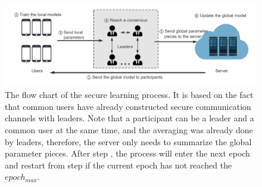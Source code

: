 \begin{figure}[!ht]
    \centering
    \includegraphics[width=2\columnwidth]{img/alg.png}
    \caption{The flow chart of the secure learning process. It is based on the fact that common users have already constructed secure communication channels with leaders. Note that a participant can be a leader and a common user at the same time, and the averaging was already done by leaders, therefore, the server only needs to summarize the global parameter pieces. After step , the process will enter the next epoch and restart from step  if the current epoch has not reached the $epoch_{max}$.}
    \label{fig-alg}
\end{figure}

